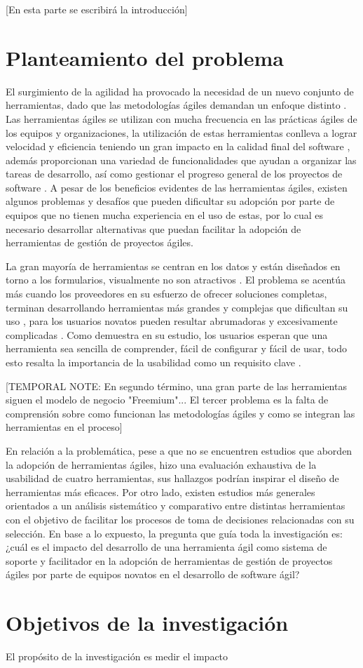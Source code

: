 [En esta parte se escribirá la introducción]

\section{Planteamiento del problema}
El surgimiento de la agilidad ha provocado la necesidad de un nuevo conjunto de herramientas, dado que las metodologías ágiles demandan un enfoque distinto \parencite{mordi:2021}. Las herramientas ágiles se utilizan con mucha frecuencia en las prácticas ágiles de los equipos y organizaciones, la utilización de estas herramientas conlleva a lograr velocidad y eficiencia teniendo un gran impacto en la calidad final del software \parencite{ozkan_mishra:2019}, además proporcionan una variedad de funcionalidades que ayudan a organizar las tareas de desarrollo, así como gestionar el progreso general de los proyectos de software \parencite{alomar:2016}. A pesar de los beneficios evidentes de las herramientas ágiles, existen algunos problemas y desafíos que pueden dificultar su adopción por parte de equipos que no tienen mucha experiencia en el uso de estas, por lo cual es necesario desarrollar alternativas que puedan facilitar la adopción de herramientas de gestión de proyectos ágiles.

La gran mayoría de herramientas se centran en los datos y están diseñados en torno a los formularios, visualmente no son atractivos \parencite{mordi:2021}. El problema se acentúa más cuando los proveedores en su esfuerzo de ofrecer soluciones completas, terminan desarrollando herramientas más grandes y complejas que dificultan su uso \parencite{azizyan:2011, ozkan_mishra:2019}, para los usuarios novatos pueden resultar abrumadoras y excesivamente complicadas \parencite{mordi:2021}. Como demuestra \textcite{dimitrijevic:2015} en su estudio, los usuarios esperan que una herramienta sea sencilla de comprender, fácil de configurar y fácil de usar, todo esto resalta la importancia de la usabilidad como un requisito clave \parencite{mordi:2021}. 

[TEMPORAL NOTE: En segundo término, una gran parte de las herramientas siguen el modelo de negocio "Freemium"... El tercer problema es la falta de comprensión sobre como funcionan las metodologías ágiles y como se integran las herramientas en el proceso] 

En relación a la problemática, pese a que no se encuentren estudios que aborden la adopción de herramientas ágiles, \textcite{alomar:2016} hizo una evaluación exhaustiva de la usabilidad de cuatro herramientas, sus hallazgos podrían inspirar el diseño de herramientas más eficaces. Por otro lado, existen estudios más generales orientados a un análisis sistemático y comparativo entre distintas herramientas con el objetivo de facilitar los procesos de toma de decisiones relacionadas con su selección. En base a lo expuesto, la pregunta que guía toda la investigación es: ¿cuál es el impacto del desarrollo de una herramienta ágil como sistema de soporte y facilitador en la adopción de herramientas de gestión de proyectos ágiles por parte de equipos novatos en el desarrollo de software ágil?

\section{Objetivos de la investigación}
El propósito de la investigación es medir el impacto 